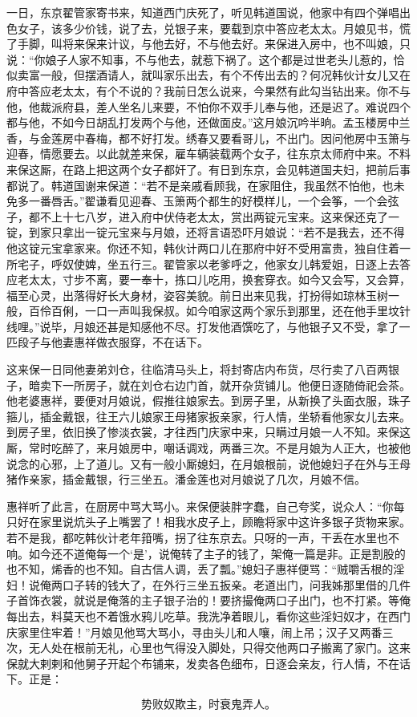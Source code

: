 一日，东京翟管家寄书来，知道西门庆死了，听见韩道国说，他家中有四个弹唱出色女子，该多少价钱，说了去，兑银子来，要载到京中答应老太太。月娘见书，慌了手脚，叫将来保来计议，与他去好，不与他去好。来保进入房中，也不叫娘，只说：“你娘子人家不知事，不与他去，就惹下祸了。这个都是过世老头儿惹的，恰似卖富一般，但摆酒请人，就叫家乐出去，有个不传出去的？何况韩伙计女儿又在府中答应老太太，有个不说的？我前日怎么说来，今果然有此勾当钻出来。你不与他，他裁派府县，差人坐名儿来要，不怕你不双手儿奉与他，还是迟了。难说四个都与他，不如今日胡乱打发两个与他，还做面皮。”这月娘沉吟半晌。孟玉楼房中兰香，与金莲房中春梅，都不好打发。绣春又要看哥儿，不出门。因问他房中玉箫与迎春，情愿要去。以此就差来保，雇车辆装载两个女子，往东京太师府中来。不料来保这厮，在路上把这两个女子都奸了。有日到东京，会见韩道国夫妇，把前后事都说了。韩道国谢来保道：“若不是亲戚看顾我，在家阻住，我虽然不怕他，也未免多一番唇舌。”翟谦看见迎春、玉箫两个都生的好模样儿，一个会筝，一个会弦子，都不上十七八岁，进入府中伏侍老太太，赏出两锭元宝来。这来保还克了一锭，到家只拿出一锭元宝来与月娘，还将言语恐吓月娘说：“若不是我去，还不得他这锭元宝拿家来。你还不知，韩伙计两口儿在那府中好不受用富贵，独自住着一所宅子，呼奴使婢，坐五行三。翟管家以老爹呼之，他家女儿韩爱姐，日逐上去答应老太太，寸步不离，要一奉十，拣口儿吃用，换套穿衣。如今又会写，又会算，福至心灵，出落得好长大身材，姿容美貌。前日出来见我，打扮得如琼林玉树一般，百伶百俐，一口一声叫我保叔。如今咱家这两个家乐到那里，还在他手里坟针线哩。”说毕，月娘还甚是知感他不尽。打发他酒馔吃了，与他银子又不受，拿了一匹段子与他妻惠祥做衣服穿，不在话下。

这来保一日同他妻弟刘仓，往临清马头上，将封寄店内布货，尽行卖了八百两银子，暗卖下一所房子，就在刘仓右边门首，就开杂货铺儿。他便日逐随倚祀会茶。他老婆惠祥，要便对月娘说，假推往娘家去。到房子里，从新换了头面衣服，珠子箍儿，插金戴银，往王六儿娘家王母猪家扳亲家，行人情，坐轿看他家女儿去来。到房子里，依旧换了惨淡衣裳，才往西门庆家中来，只瞒过月娘一人不知。来保这厮，常时吃醉了，来月娘房中，嘲话调戏，两番三次。不是月娘为人正大，也被他说念的心邪，上了道儿。又有一般小厮媳妇，在月娘根前，说他媳妇子在外与王母猪作亲家，插金戴银，行三坐五。潘金莲也对月娘说了几次，月娘不信。

惠祥听了此言，在厨房中骂大骂小。来保便装胖字蠢，自己夸奖，说众人：“你每只好在家里说炕头子上嘴罢了！相我水皮子上，顾瞻将家中这许多银子货物来家。若不是我，都吃韩伙计老年箝嘴，拐了往东京去。只呀的一声，干丢在水里也不响。如今还不道俺每一个‘是’，说俺转了主子的钱了，架俺一篇是非。正是割股的也不知，烯香的也不知。自古信人调，丢了瓢。”媳妇子惠祥便骂：“贼嚼舌根的淫妇！说俺两口子转的钱大了，在外行三坐五扳亲。老道出门，问我姊那里借的几件子首饰衣裳，就说是俺落的主子银子治的！要挤撮俺两口子出门，也不打紧。等俺每出去，料莫天也不着饿水鸦儿吃草。我洗净着眼儿，看你这些淫妇奴才，在西门庆家里住牢着！”月娘见他骂大骂小，寻由头儿和人嚷，闹上吊；汉子又两番三次，无人处在根前无礼，心里也气得没入脚处，只得交他两口子搬离了家门。这来保就大剌剌和他舅子开起个布铺来，发卖各色细布，日逐会亲友，行人情，不在话下。正是：

\[
势败奴欺主，时衰鬼弄人。
\]

